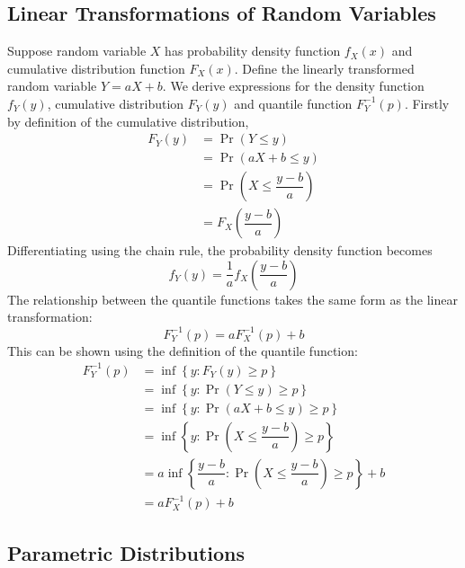 \documentclass[11pt]{report} %
\begin{document}
\subsection{Linear Transformations of Random Variables}

Suppose random variable $X$ has probability density function $f_{X}\left(x\right)$ and cumulative distribution function $F_{X}\left(x\right)$. Define the linearly transformed random variable $Y = aX + b$. We derive expressions for the density function $f_{Y}\left(y\right)$, cumulative distribution $F_{Y}\left(y\right)$ and quantile function $F_{Y}^{-1}\left(p\right)$. Firstly by definition of the cumulative distribution,
\begin{align}
F_{Y}\left(y\right) &= \operatorname{Pr}\left(Y \leq y\right) \\
&= \operatorname{Pr}\left(aX + b \leq y\right) \\
&= \operatorname{Pr}\left(X \leq \dfrac{y - b}{a}\right) \\
&= F_{X}\left(\dfrac{y - b}{a}\right)
\end{align}
Differentiating using the chain rule, the probability density function becomes
\begin{equation}
f_{Y}\left(y\right) = \dfrac{1}{a}f_{X}\left(\dfrac{y - b}{a}\right)
\end{equation}
The relationship between the quantile functions takes the same form as the linear transformation:
\begin{equation}
F_{Y}^{-1}\left(p\right) = aF_{X}^{-1}\left(p\right) + b
\end{equation}
This can be shown using the definition of the quantile function:
\begin{align}
F_{Y}^{-1}\left(p\right) &= \inf\left\{y: F_{Y}\left(y\right) \geq p\right\} \\
&= \inf\left\{y: \operatorname{Pr}\left(Y \leq y\right) \geq p\right\} \\
&= \inf\left\{y: \operatorname{Pr}\left(aX + b \leq y\right) \geq p\right\} \\
&= \inf\left\{y: \operatorname{Pr}\left(X \leq \dfrac{y - b}{a}\right) \geq p\right\} \\
&= a\inf\left\{\dfrac{y - b}{a}: \operatorname{Pr}\left(X \leq \dfrac{y - b}{a}\right) \geq p\right\} + b \\
&= aF_{X}^{-1}\left(p\right) + b
\end{align}

\subsection{Parametric Distributions}
\end{document}
